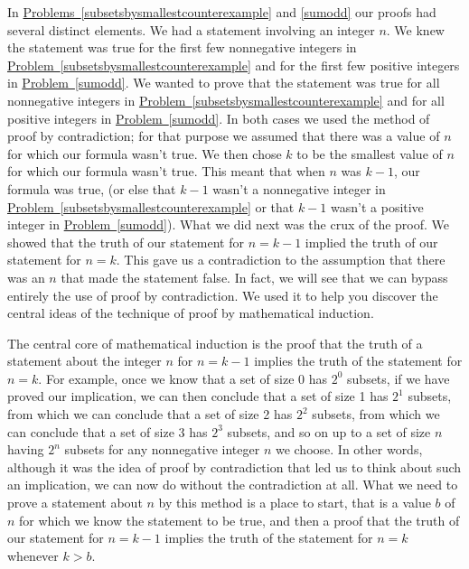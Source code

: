 \documentclass[10pt,]{book}
\theoremstyle{plain}
\theoremstyle{definition}
\theoremstyle{definition}
\numberwithin{equation}{chapter}
\begin{document}
In \hyperref[subsetsbysmallestcounterexample]{Problems~\ref{subsetsbysmallestcounterexample}} and \hyperref[sumodd]{\ref{sumodd}} our proofs had several distinct elements. We had a statement involving an integer \(n\). We knew the statement was true for the first few nonnegative integers in \hyperref[subsetsbysmallestcounterexample]{Problem~\ref{subsetsbysmallestcounterexample}} and for the first few positive integers in \hyperref[sumodd]{Problem~\ref{sumodd}}. We wanted to prove that the statement was true for all nonnegative integers in \hyperref[subsetsbysmallestcounterexample]{Problem~\ref{subsetsbysmallestcounterexample}} and for all positive integers in \hyperref[sumodd]{Problem~\ref{sumodd}}. In both cases we used the method of proof by contradiction; for that purpose we assumed that there was a value of \(n\) for which our formula wasn't true. We then chose \(k\) to be the smallest value of \(n\) for which our formula wasn't true. This meant that when \(n\) was \(k-1\), our formula was true, (or else that \(k-1\) wasn't a nonnegative integer in \hyperref[subsetsbysmallestcounterexample]{Problem~\ref{subsetsbysmallestcounterexample}} or that \(k-1\) wasn't a positive integer in \hyperref[sumodd]{Problem~\ref{sumodd}}). What we did next was the crux of the proof. We showed that the truth of our statement for \(n=k-1\) implied the truth of our statement for \(n=k\). This gave us a contradiction to the assumption that there was an \(n\) that made the statement false. In fact, we will see that we can bypass entirely the use of proof by contradiction. We used it to help you discover the central ideas of the technique of proof by mathematical induction.%
\par
The central core of mathematical induction is the proof that the truth of a statement about the integer \(n\) for \(n=k-1\) implies the truth of the statement for \(n=k\). For example, once we know that a set of size 0 has \(2^0\) subsets, if we have proved our implication, we can then conclude that a set of size 1 has \(2^1\) subsets, from which we can conclude that a set of size 2 has \(2^2\) subsets, from which we can conclude that a set of size 3 has \(2^3\) subsets, and so on up to a set of size \(n\) having \(2^n\) subsets for any nonnegative integer \(n\) we choose. In other words, although it was the idea of proof by contradiction that led us to think about such an implication, we can now do without the contradiction at all. What we need to prove a statement about \(n\) by this method is a place to start, that is a value \(b\) of \(n\) for which we know the statement to be true, and then a proof that the truth of our statement for \(n=k-1\) implies the truth of the statement for \(n=k\) whenever \(k>b\).%
\typeout{************************************************}
\typeout{************************************************}
\end{document}
